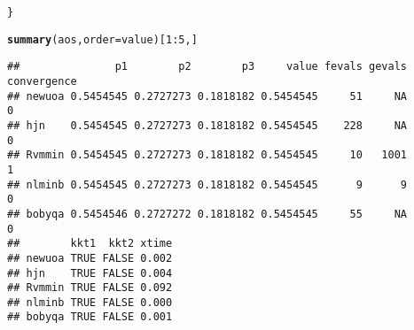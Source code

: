 \documentclass[11pt]{article}\usepackage[]{graphicx}\usepackage[]{color}
\makeatletter
\newcommand{\hlnum}[1]{\textcolor[rgb]{0.686,0.059,0.569}{#1}}%
\newcommand{\hlopt}[1]{\textcolor[rgb]{0,0,0}{#1}}%
\newcommand{\hlstd}[1]{\textcolor[rgb]{0.345,0.345,0.345}{#1}}%
\newcommand{\hlkwc}[1]{\textcolor[rgb]{0.333,0.667,0.333}{#1}}%
\newcommand{\hlkwd}[1]{\textcolor[rgb]{0.737,0.353,0.396}{\textbf{#1}}}%
\newenvironment{kframe}{%
 \def\at@end@of@kframe{}%
 \ifinner\ifhmode%
  \def\at@end@of@kframe{\end{minipage}}%
  \begin{minipage}{\columnwidth}%
 \fi\fi%
 \def\FrameCommand##1{\hskip\@totalleftmargin \hskip-\fboxsep
 \colorbox{shadecolor}{##1}\hskip-\fboxsep
     \hskip-\linewidth \hskip-\@totalleftmargin \hskip\columnwidth}%
 \MakeFramed {\advance\hsize-\width
   \@totalleftmargin\z@ \linewidth\hsize
   \@setminipage}}%
 {\par\unskip\endMakeFramed%
 \at@end@of@kframe}
\newenvironment{knitrout}{}{} %
\makeatother
\begin{document}
\begin{knitrout}
\begin{kframe}
\begin{alltt}
\hlstd{\}}

\hlkwd{summary}\hlstd{(aos,}\hlkwc{order}\hlstd{=value)[}\hlnum{1}\hlopt{:}\hlnum{5}\hlstd{,]}
\end{alltt}
\begin{verbatim}
##               p1        p2        p3     value fevals gevals convergence
## newuoa 0.5454545 0.2727273 0.1818182 0.5454545     51     NA           0
## hjn    0.5454545 0.2727273 0.1818182 0.5454545    228     NA           0
## Rvmmin 0.5454545 0.2727273 0.1818182 0.5454545     10   1001           1
## nlminb 0.5454545 0.2727273 0.1818182 0.5454545      9      9           0
## bobyqa 0.5454546 0.2727272 0.1818182 0.5454545     55     NA           0
##        kkt1  kkt2 xtime
## newuoa TRUE FALSE 0.002
## hjn    TRUE FALSE 0.004
## Rvmmin TRUE FALSE 0.092
## nlminb TRUE FALSE 0.000
## bobyqa TRUE FALSE 0.001
\end{verbatim}
\end{kframe}
\end{knitrout}
\end{document}
